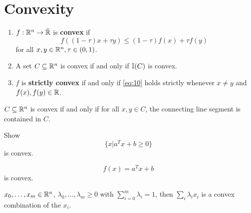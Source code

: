 \chapter{Convexity}
\label{cha:convexity}

\begin{defn}
  \label{defn:convexity:1}
  \begin{enumerate}
  \item $f: \mathbb{R}^{n} \rightarrow \bar {\mathbb{R}}$ is \textbf{convex} if
    \begin{equation}
      \label{eq:10}
      f((1 - \tau) x + \tau y) \leq (1 - \tau) f(x) + \tau f(y)
    \end{equation} for all $x, y \in \mathbb{R}^{n}, \tau \in (0, 1)$.
  \item A set $C \subseteq \mathbb{R}^{n}$ is convex if and only if $\I{C}$ is convex.
  \item $f$ is \textbf{strictly convex} if and only if \eqref{eq:10}
    holds strictly whenever $x \neq y$ and $f(x), f(y) \in \mathbb{R}$.
  \end{enumerate}
\end{defn}

\begin{remark}
  $C \subseteq \mathbb{R}^{n}$ is convex if and only if for all $x, y \in C$,
  the connecting line segment is contained in $C$.
\end{remark}

\begin{exer}
  Show 
  \begin{equation}
    \label{eq:11}
    \{ x | a^{T} x  + b \geq 0 \}    
  \end{equation} is convex.

  \begin{equation}
    \label{eq:12}
    f(x) = a^{T}x + b
  \end{equation} is convex.
\end{exer}

\begin{defn}
  \label{defn:convexity:2}
  $x_{0}, \dots, x_{m} \in \mathbb{R}^{n}$, $\lambda_{0}, \dots, \lambda_{m}
  \geq 0$ with $\sum_{i=0}^{m} \lambda_{i} = 1$, then $\sum_{i}
  \lambda_{i} x_{i}$ is a convex combination of the $x_{i}$.  
\end{defn}

